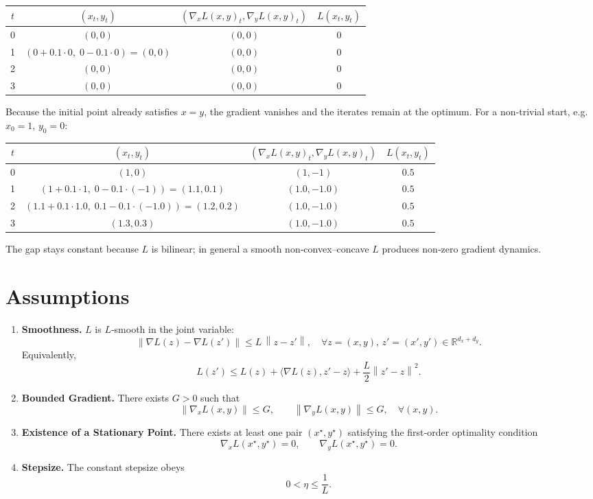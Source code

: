 \documentclass{article}
\newcommand{\norm}[1]{\left\|#1\right\|}
\newcommand{\inner}[2]{\langle #1,#2\rangle}
\newcommand{\gradx}{\nabla_x L(x,y)}
\newcommand{\grady}{\nabla_y L(x,y)}
\begin{document}
\begin{tabular}{c|c|c|c}
$t$ & $(x_t,y_t)$ & $(\gradx_t,\grady_t)$ & $L(x_t,y_t)$\\\hline
0 & $(0,0)$ & $(0,0)$ & $0$\\
1 & $(0+0.1\cdot0,\;0-0.1\cdot0)=(0,0)$ & $(0,0)$ & $0$\\
2 & $(0,0)$ & $(0,0)$ & $0$\\
3 & $(0,0)$ & $(0,0)$ & $0$
\end{tabular}

Because the initial point already satisfies $x=y$, the gradient vanishes and the iterates remain at the optimum.  For a non‑trivial start, e.g. $x_0=1$, $y_0=0$:

\begin{tabular}{c|c|c|c}
$t$ & $(x_t,y_t)$ & $(\gradx_t,\grady_t)$ & $L(x_t,y_t)$\\\hline
0 & $(1,0)$ & $(1, -1)$ & $0.5$\\
1 & $(1+0.1\cdot1,\;0-0.1\cdot(-1))=(1.1,0.1)$ & $(1.0, -1.0)$ & $0.5$\\
2 & $(1.1+0.1\cdot1.0,\;0.1-0.1\cdot(-1.0))=(1.2,0.2)$ & $(1.0, -1.0)$ & $0.5$\\
3 & $(1.3,0.3)$ & $(1.0,-1.0)$ & $0.5$
\end{tabular}
The gap stays constant because $L$ is bilinear; in general a smooth non‑convex–concave $L$ produces non‑zero gradient dynamics.

\newpage
\section*{Assumptions}
\begin{enumerate}[label={A\arabic*}.]
\item \textbf{Smoothness.} $L$ is $L$‑smooth in the joint variable:
\[
\norm{\nabla L(z)-\nabla L(z')}\le L\,\norm{z-z'},\quad
\forall z=(x,y),\,z'=(x',y')\in\mathbb{R}^{d_x+d_y}.
\tag{A1}
\]
Equivalently,
\[
L(z')\le L(z)+\inner{\nabla L(z)}{z'-z}+\frac{L}{2}\norm{z'-z}^2 .
\tag{A1'}
\]

\item \textbf{Bounded Gradient.} There exists $G>0$ such that
\[
\norm{\nabla_x L(x,y)}\le G,\qquad \norm{\nabla_y L(x,y)}\le G,
\quad\forall(x,y).
\tag{A2}
\]

\item \textbf{Existence of a Stationary Point.} There exists at least one pair
$(x^\star,y^\star)$ satisfying the first‑order optimality condition
\[
\nabla_x L(x^\star,y^\star)=0,\qquad \nabla_y L(x^\star,y^\star)=0 .
\tag{A3}
\]

\item \textbf{Stepsize.} The constant stepsize obeys
\[
0<\eta\le \frac{1}{L}.
\tag{A4}
\]
\end{enumerate}
\end{document}
